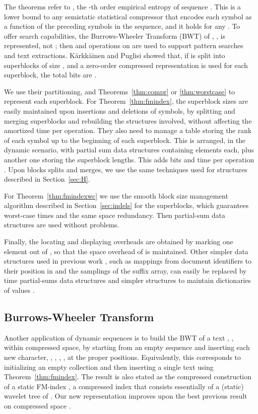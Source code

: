 \documentclass[11pt]{article}
\begin{document}
The theorems refer to , the -th order empirical 
entropy of sequence  \cite{Man01}. This is a lower bound to any
semistatic statistical compressor that encodes each symbol as a function of
the  preceding symbols in the sequence, and it holds  for any .
To offer search capabilities, the Burrows-Wheeler Transform (BWT)
\cite{BW94} of , , is represented, not 
; then  and  operations on  
are used to support pattern
searches and text extractions. K\"arkk\"ainen and Puglisi \cite{KP11} showed 
that, if 
 is split into superblocks of size ,
and a zero-order compressed representation is used for each superblock, the
total bits are .

We use their partitioning, and Theorems~\ref{thm:compr} or
\ref{thm:worstcase} to represent each superblock. 
For Theorem~\ref{thm:fmindex}, the superblock sizes are easily maintained upon 
insertions and deletions of symbols, by splitting and merging superblocks and 
rebuilding the structures involved, without affecting the amortized time per 
operation. They \cite{KP11} also need to manage a table storing the rank of 
each symbol up to the beginning of each superblock. This is arranged, in the 
dynamic scenario, with  partial sum data structures containing 
 elements each, plus another one storing the superblock 
lengths. This adds  bits and  time per 
operation \cite[Lem.~1]{NS10}. Upon blocks splits and merges, we use the
same techniques used for  structures described in Section~\ref{sec:H}.

For Theorem~\ref{thm:fmindexwc} we use the smooth block size management
algorithm described in Section~\ref{sec:indels} for the superblocks, which 
guarantees worst-case times and the same space redundancy. Then partial-sum 
data structures are used without problems.

Finally, the locating and displaying overheads are obtained by marking one
element out of , so that the space overhead of 
 is maintained. Other simpler data structures used in previous
work \cite{MN08}, such as mappings from document identifiers to their position
in  and the samplings of the suffix array, can easily be 
replaced by  time partial-sums data structures and simpler
structures to maintain dictionaries of values \cite[Lem.~1]{NS10}.

\subsection{Burrows-Wheeler Transform} 

Another application
of dynamic sequences is to build the BWT of a text , , within
compressed space, by starting from an empty sequence and inserting each new
character, , , , , at the proper positions. 
Equivalently, this corresponds to initializing an empty collection and then
inserting a single text  using Theorem~\ref{thm:fmindex}. The
result is also stated as the compressed construction of a static FM-index
\cite{FMMN07}, a compressed index that consists essentially of a (static) 
wavelet tree of . Our new representation improves upon the best 
previous result on compressed space \cite{NS10}.
\end{document}
